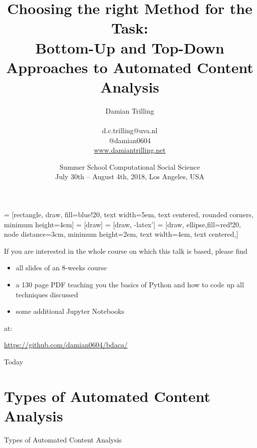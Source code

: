 \documentclass{beamer}
\begin{document}
\title[Bottom-Up and Top-Down Automated Content Analysis]{Choosing the right Method for the Task:\\{\textbf{Bottom-Up and Top-Down Approaches to Automated Content Analysis}}}
\author[Damian Trilling]{Damian Trilling \\ ~ \\ \footnotesize{d.c.trilling@uva.nl \\@damian0604} \\ \url{www.damiantrilling.net}}
\date{Summer School Computational Social Science\\
July 30th – August 4th, 2018, Los Angeles, USA }





 = [rectangle, draw, fill=blue!20, 
text width=5em, text centered, rounded corners, minimum height=4em]
 = [draw]
 = [draw, -latex']
 = [draw, ellipse,fill=red!20, node distance=3cm,
minimum height=2em, text width=4em, text centered,]






\begin{frame}{}
\titlepage
\end{frame}


\begin{frame}[plain]
If you are interested in the whole course on which this talk is based, please find 
\begin{itemize}
	\item all slides of an 8-weeks course
	\item a 130 page PDF teaching you the basics of Python and how to code up all techniques discussed
	\item some additional Jupyter Notebooks
\end{itemize}
at:


\huge
\url{https://github.com/damian0604/bdaca/}
\tiny
\end{frame}


\begin{frame}{Today}
\tableofcontents
\end{frame}




\section[Types of ACA]{Types of Automated Content Analysis}
\begin{frame}{}
Types of Automated Content Analysis
\end{frame}
\end{document}
